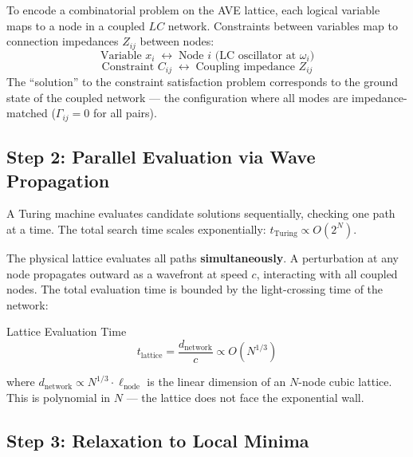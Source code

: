 To encode a combinatorial problem on the AVE lattice, each logical variable maps to a node in a coupled $LC$ network. Constraints between variables map to connection impedances $Z_{ij}$ between nodes:
\begin{equation}
    \text{Variable } x_i \;\longleftrightarrow\; \text{Node } i \text{ (LC oscillator at } \omega_i\text{)}
\end{equation}
\begin{equation}
    \text{Constraint } C_{ij} \;\longleftrightarrow\; \text{Coupling impedance } Z_{ij}
\end{equation}
The ``solution'' to the constraint satisfaction problem corresponds to the ground state of the coupled network --- the configuration where all modes are impedance-matched ($\Gamma_{ij} = 0$ for all pairs).

\subsection{Step 2: Parallel Evaluation via Wave Propagation}

A Turing machine evaluates candidate solutions sequentially, checking one path at a time. The total search time scales exponentially: $t_\mathrm{Turing} \propto O(2^N)$.

The physical lattice evaluates all paths \textbf{simultaneously}. A perturbation at any node propagates outward as a wavefront at speed $c$, interacting with all coupled nodes. The total evaluation time is bounded by the light-crossing time of the network:
\begin{resultbox}{Lattice Evaluation Time}
\begin{equation}
    t_\mathrm{lattice} = \frac{d_\mathrm{network}}{c} \propto O(N^{1/3})
\end{equation}
\end{resultbox}
where $d_\mathrm{network} \propto N^{1/3} \cdot \ell_\mathrm{node}$ is the linear dimension of an $N$-node cubic lattice. This is polynomial in $N$ --- the lattice does not face the exponential wall.

\subsection{Step 3: Relaxation to Local Minima}

